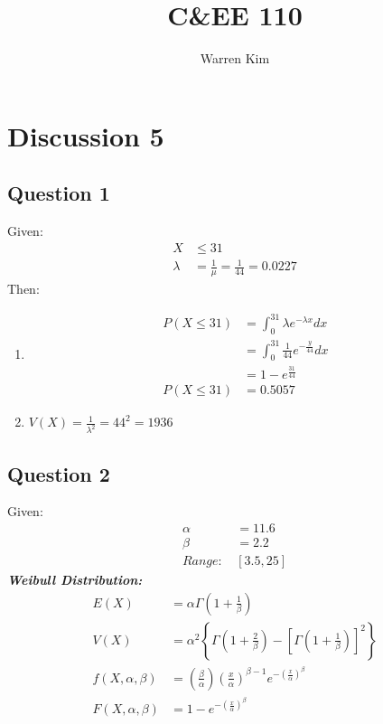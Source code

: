 \documentclass[13pt]{article}
\title{C\&EE 110}
\author{Warren Kim}
\begin{document}
\maketitle

\newpage
\section*{Discussion 5}
\subsection*{Question 1}
Given:
\begin{align*}
  X &\leq 31 \\
  \lambda &= \frac{1}{\mu} = \frac{1}{44} = 0.0227
\end{align*}
Then:
\begin{enumerate}[label=(\alph*)]
\item
  \begin{align*}
    P(X \leq 31) &= \int_{0}^{31} \lambda e^{-\lambda x}dx \\
                 &= \int_{0}^{31} \frac{1}{44} e^{- \frac{y}{44}}dx \\
                 &= 1 - e^{\frac{31}{44}} \\
    P(X \leq 31) &= 0.5057
  \end{align*}
\item $V(X) = \frac{1}{\lambda^2} = 44^2 = 1936$
\end{enumerate}

\subsection*{Question 2}
Given:
\begin{align*}
  \alpha &= 11.6 \\
  \beta &= 2.2 \\
  \textit{Range: } &[3.5, 25]
\end{align*}
\textit{\textbf{Weibull Distribution:}}
\begin{align*}
  E(X) &= \alpha \Gamma \left(1 + \frac{1}{\beta}\right) \\
  V(X) &= \alpha^2 \left\{ \Gamma \left(1 + \frac{2}{\beta}\right)
         - \left[\Gamma \left(1 + \frac{1}{\beta}\right)\right]^2\right\} \\
  f(X, \alpha, \beta) &= \left( \frac{\beta}{\alpha} \right)
                        \left( \frac{x}{\alpha} \right)^{\beta - 1}
                        e^{- \left( \frac{x}{\alpha} \right)^{\beta}} \\
  F(X, \alpha, \beta) &= 1 - e^{- \left( \frac{x}{\alpha} \right)^{\beta}}
\end{align*}
\end{document}

